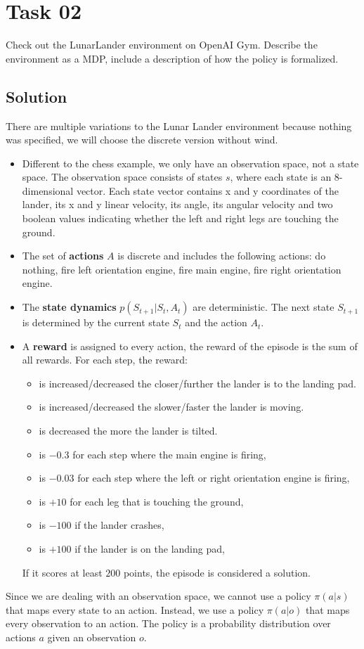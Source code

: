 \documentclass{article}
\begin{document}
\section{Task 02}
Check out the LunarLander environment on OpenAI Gym. Describe the environment as a MDP, 
include a description of how the policy is
formalized.
\subsection{Solution}
There are multiple variations to the Lunar Lander environment \textemdash{} because nothing was 
specified, we will choose the discrete version without wind.
\begin{itemize}
    \item Different to the chess example, we only have an observation space, not a state space. The observation
    space consists of states $s$, where each state is an 8-dimensional vector. Each state vector contains
    x and y coordinates of the lander, its x and y linear velocity, its angle, its angular velocity and 
    two boolean values indicating whether the left and right legs are touching the ground.
    \item The set of \textbf{actions} $A$ is discrete and includes the following actions: do nothing, fire left orientation engine,
    fire main engine, fire right orientation engine.
    \item The \textbf{state dynamics} $p(S_{t+1} | S_t, A_t)$ are deterministic. The next state $S_{t+1}$ is
    determined by the current state $S_t$ and the action $A_t$.
    \item A \textbf{reward} is assigned to every action, the reward of the episode is the 
    sum of all rewards. For each step, the reward:
    \begin{itemize}
        \item is increased/decreased the closer/further the lander is to the landing pad.
        \item is increased/decreased the slower/faster the lander is moving.
        \item is decreased the more the lander is tilted.
        \item is $-0.3$ for each step where the main engine is firing,
        \item is $-0.03$ for each step where the left or right orientation engine is firing,
        \item is $+10$ for each leg that is touching the ground,
        \item is $-100$ if the lander crashes,
        \item is $+100$ if the lander is on the landing pad,
    \end{itemize}
    If it scores at least $200$ points, the episode is considered a solution.
\end{itemize}
Since we are dealing with an observation space, we cannot use a policy $\pi(a|s)$ that maps every state
to an action. Instead, we use a policy $\pi(a|o)$ that maps every observation to an action. The policy
is a probability distribution over actions $a$ given an observation $o$.
\end{document}
